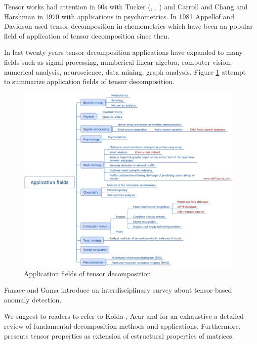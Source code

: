 \documentclass[letterpaper,12pt]{article}
\begin{document}
Tensor works had attention in 60s with Tucker (\cite{Tucker1963}, \cite{Tucker1964}, \cite{Tucker1966}) and Carroll and Chang \cite{Carroll1970} and Harshman in 1970 \cite{Harshman1970} with applications in psychometrics. In 1981 Appellof and Davidson \cite{Appellof1981} used tensor decomposition in chemometrics which have been an popular field of application of tensor decomposition since then.

In last twenty years tensor decomposition applications have expanded to many fields such as signal processing, numberical linear algebra, computer vision, numerical analysis, neuroscience, data mining, graph analysis. Figure \ref{fig:applications} attempt to summarize application fields of tensor decomposition. 

\begin{figure}[!ht]
\centering
 \includegraphics[scale=0.3]{Images/application_fields.eps}
 \caption{Application fields of tensor decomposition}\label{fig:applications}
\end{figure}




Fanaee and Gama \cite{Fanaee-T2016} introduce an interdisciplinary survey about tensor-based anomaly detection.


We suggest to readers to refer to Kolda \cite{Kolda2009}, Acar \cite{Acar2009} and \cite{Comon2014} for an exhaustive a detailed review of fundamental decomposition methods and applications. Furthermore, \cite{Dartois2016} presents tensor properties as extension of estructural properties of matrices.
\end{document}
